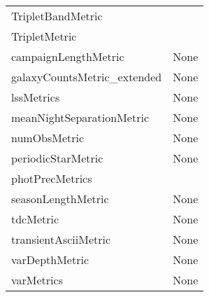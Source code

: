 \begin{tabular}{ll}
           TripletBandMetric &                                                    \\
               TripletMetric &                                                    \\
        campaignLengthMetric &                                               None \\
 galaxyCountsMetric\_extended &                                               None \\
                  lssMetrics &                                               None \\
   meanNightSeparationMetric &                                               None \\
                numObsMetric &                                               None \\
          periodicStarMetric &                                               None \\
             photPrecMetrics &                                                    \\
          seasonLengthMetric &                                               None \\
                   tdcMetric &                                               None \\
        transientAsciiMetric &                                               None \\
              varDepthMetric &                                               None \\
                  varMetrics &                                               None \\
\bottomrule
\end{tabular}

